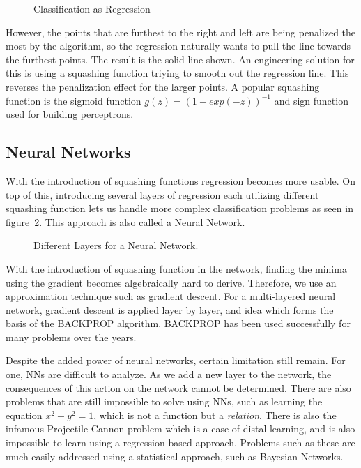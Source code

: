 \documentclass{ecctd01} %
\begin{document}
\begin{figure}[htpb]
\vspace{4.0cm}
\caption{\label{clasreg1} Classification as Regression}
\end{figure}

However, the points that are furthest to the right and left are being
penalized the most by the algorithm, so the regression naturally wants
to pull the line towards the furthest points. The result is the solid
line shown. An engineering solution for this is using a squashing
function triying to smooth out the regression line. This reverses the
penalization effect for the larger points. A popular squashing
function is the sigmoid function $g(z) = (1 + exp(-z))^{-1}$ and sign
function used for building perceptrons. 

\subsection{Neural Networks}

With the introduction of squashing functions regression becomes more
usable. On top of this, introducing several layers of regression each
utilizing different squashing function lets us handle more complex
classification problems as seen in figure~\ref{nn1}. This approach is
also called a Neural Network.

\begin{figure}[htpb]
\vspace{3.0cm}
\caption{\label{nn1} Different Layers for a Neural Network.}
\end{figure}

With the introduction of squashing function in the network, finding
the minima using the gradient becomes algebraically hard to
derive. Therefore, we use an approximation technique such as gradient
descent. For a multi-layered neural network, gradient descent is
applied layer by layer, and idea which forms the basis of the BACKPROP
algorithm. BACKPROP has been used successfully for many problems
over the years.

Despite the added power of neural networks, certain limitation still
remain. For one, NNs are difficult to analyze. As we add a new layer
to the network, the consequences of this action on the network cannot be
determined. There are also problems that are still impossible to solve
using NNs, such as learning the equation $x^2+y^2=1$, which is not a
function but a {\em relation}. There is also the infamous Projectile
Cannon problem which is a case of distal learning, and is also
impossible to learn using a regression based approach. Problems such
as these are much easily addressed using a statistical approach, such
as Bayesian Networks. 
\end{document}
